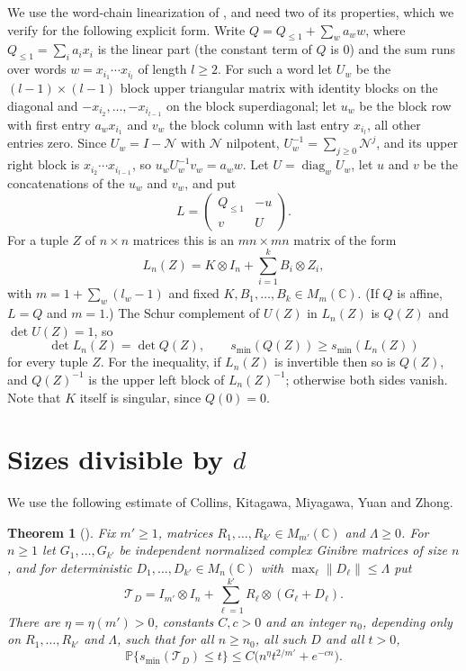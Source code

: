 \documentclass[11pt]{article}
\newtheorem{theorem}{Theorem}[section]
\theoremstyle{remark}
\newcommand{\C}{\mathbb C}
\newcommand{\Prob}{\mathbb P}
\newcommand{\smin}{s_{\min}}
\DeclareMathOperator{\diag}{diag}
\begin{document}
We use the word-chain linearization of \cite[Lemma~2.13]{CKMYZ}, and need two of its properties, which we verify for the following explicit form. Write $Q=Q_{\le1}+\sum_wa_ww$, where $Q_{\le1}=\sum_i a_ix_i$ is the linear part (the constant term of $Q$ is $0$) and the sum runs over words $w=x_{i_1}\cdots x_{i_l}$ of length $l\ge2$. For such a word let $U_w$ be the $(l-1)\times(l-1)$ block upper triangular matrix with identity blocks on the diagonal and $-x_{i_2},\dots,-x_{i_{l-1}}$ on the block superdiagonal; let $u_w$ be the block row with first entry $a_wx_{i_1}$ and $v_w$ the block column with last entry $x_{i_l}$, all other entries zero. Since $U_w=I-\mathcal N$ with $\mathcal N$ nilpotent, $U_w^{-1}=\sum_{j\ge0}\mathcal N^j$, and its upper right block is $x_{i_2}\cdots x_{i_{l-1}}$, so $u_wU_w^{-1}v_w=a_ww$. Let $U=\diag_w U_w$, let $u$ and $v$ be the concatenations of the $u_w$ and $v_w$, and put
\[
L=\begin{pmatrix}Q_{\le1}&-u\\ v&U\end{pmatrix}.
\]
For a tuple $Z$ of $n\times n$ matrices this is an $mn\times mn$ matrix of the form
\begin{equation}\label{eq:pencil}
L_n(Z)=K\otimes I_n+\sum_{i=1}^kB_i\otimes Z_i ,
\end{equation}
with $m=1+\sum_w(l_w-1)$ and fixed $K,B_1,\dots,B_k\in M_m(\C)$. (If $Q$ is affine, $L=Q$ and $m=1$.) The Schur complement of $U(Z)$ in $L_n(Z)$ is $Q(Z)$ and $\det U(Z)=1$, so
\begin{equation}\label{eq:lin}
\det L_n(Z)=\det Q(Z),\qquad \smin(Q(Z))\ge\smin(L_n(Z))
\end{equation}
for every tuple $Z$. For the inequality, if $L_n(Z)$ is invertible then so is $Q(Z)$, and $Q(Z)^{-1}$ is the upper left block of $L_n(Z)^{-1}$; otherwise both sides vanish. Note that $K$ itself is singular, since $Q(0)=0$.

\section{\texorpdfstring{Sizes divisible by $d$}{Sizes divisible by d}}\label{sec:divisible}

We use the following estimate of Collins, Kitagawa, Miyagawa, Yuan and Zhong.

\begin{theorem}[{\cite[Theorem~3.4]{CKMYZ}}]\label{thm:ckmyz}
Fix $m'\ge1$, matrices $R_1,\dots,R_{k'}\in M_{m'}(\C)$ and $\Lambda\ge0$. For $n\ge1$ let $G_1,\dots,G_{k'}$ be independent normalized complex Ginibre matrices of size $n$, and for deterministic $D_1,\dots,D_{k'}\in M_n(\C)$ with $\max_\ell\|D_\ell\|\le\Lambda$ put
\[
\mathcal T_D=I_{m'}\otimes I_n+\sum_{\ell=1}^{k'}R_\ell\otimes(G_\ell+D_\ell).
\]
There are $\eta=\eta(m')>0$, constants $C,c>0$ and an integer $n_0$, depending only on $R_1,\dots,R_{k'}$ and $\Lambda$, such that for all $n\ge n_0$, all such $D$ and all $t>0$,
\[
\Prob\{\smin(\mathcal T_D)\le t\}\le C\bigl(n^{\eta}t^{2/m'}+e^{-cn}\bigr).
\]
\end{theorem}
\end{document}
